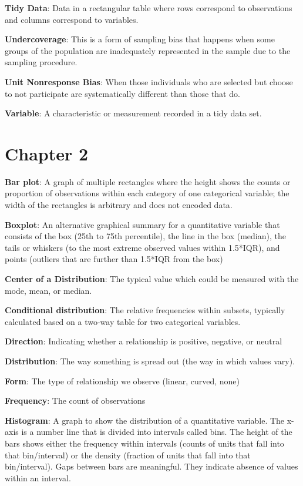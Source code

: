\documentclass[
]{book}
\begin{document}
\textbf{Tidy Data}: Data in a rectangular table where rows correspond to observations and columns correspond to variables.

\textbf{Undercoverage}: This is a form of sampling bias that happens when some groups of the population are inadequately represented in the sample due to the sampling procedure.

\textbf{Unit Nonresponse Bias}: When those individuals who are selected but choose to not participate are systematically different than those that do.

\textbf{Variable}: A characteristic or measurement recorded in a tidy data set.

\section{Chapter 2}\label{chapter-2}

\textbf{Bar plot}: A graph of multiple rectangles where the height shows the counts or proportion of observations within each category of one categorical variable; the width of the rectangles is arbitrary and does not encoded data.

\textbf{Boxplot}: An alternative graphical summary for a quantitative variable that consists of the box (25th to 75th percentile), the line in the box (median), the tails or whiskers (to the most extreme observed values within 1.5*IQR), and points (outliers that are further than 1.5*IQR from the box)

\textbf{Center of a Distribution}: The typical value which could be measured with the mode, mean, or median.

\textbf{Conditional distribution}: The relative frequencies within subsets, typically calculated based on a two-way table for two categorical variables.

\textbf{Direction}: Indicating whether a relationship is positive, negative, or neutral

\textbf{Distribution}: The way something is spread out (the way in which values vary).

\textbf{Form}: The type of relationship we observe (linear, curved, none)

\textbf{Frequency}: The count of observations

\textbf{Histogram}: A graph to show the distribution of a quantitative variable. The x-axis is a number line that is divided into intervals called bins. The height of the bars shows either the frequency within intervals (counts of units that fall into that bin/interval) or the density (fraction of units that fall into that bin/interval). Gaps between bars are meaningful. They indicate absence of values within an interval.
\end{document}
